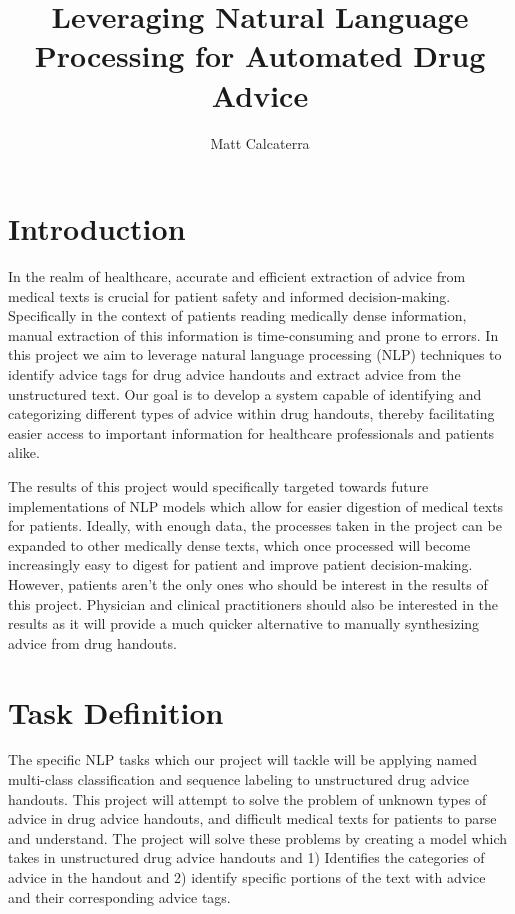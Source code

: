 \documentclass[11pt]{article}
\title{Leveraging Natural Language Processing for Automated Drug Advice}
\author{Matt Calcaterra}
\begin{document}
\maketitle

\section{Introduction}
In the realm of healthcare, accurate and efficient extraction of advice from medical texts is crucial for patient safety and informed decision-making. Specifically in the context of patients reading medically dense information, manual extraction of this information is time-consuming and prone to errors. In this project we aim to leverage natural language processing (NLP) techniques to identify advice tags for drug advice handouts and extract advice from the unstructured text. Our goal is to develop a system capable of identifying and categorizing different types of advice within drug handouts, thereby facilitating easier access to important information for healthcare professionals and patients alike.

The results of this project would specifically targeted towards future implementations of NLP models which allow for easier digestion of medical texts for patients. Ideally, with enough data, the processes taken in the project can be expanded to other medically dense texts, which once processed will become increasingly easy to digest for patient and improve patient decision-making. However, patients aren't the only ones who should be interest in the results of this project. Physician and clinical practitioners should also be interested in the results as it will provide a much quicker alternative to manually synthesizing advice from drug handouts.

\section{Task Definition}
The specific NLP tasks which our project will tackle will be applying named multi-class classification and sequence labeling to unstructured drug advice handouts. This project will attempt to solve the problem of unknown types of advice in drug advice handouts, and difficult medical texts for patients to parse and understand. The project will solve these problems by creating a model which takes in unstructured drug advice handouts and 1) Identifies the categories of advice in the handout and 2) identify specific portions of the text with advice and their corresponding advice tags. 
\end{document}
